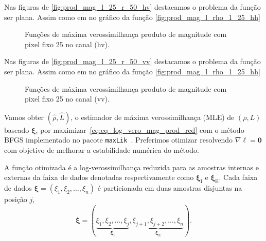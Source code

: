 Nas figuras de \eqref{fig:prod_mag_l_25_r_50_hv} destacamos o problema da função ser plana. Assim como em no gráfico da função \eqref{fig:prod_mag_l_rho_1_25_hh} 


\begin{figure*}[hbt]
	\centering
     \caption{Funções de máxima verossimilhança produto de magnitude com pixel fixo 25 no canal (hv).}
     \label{fig:prod_mag_l_25_r_50_hv} 
   \end{figure*}

Nas figuras de \eqref{fig:prod_mag_l_25_r_50_vv} destacamos o problema da função ser plana. Assim como em no gráfico da função \eqref{fig:prod_mag_l_rho_1_25_hh} 

\begin{figure*}[hbt]
	\centering
     \caption{Funções de máxima verossimilhança produto de magnitude com pixel fixo 25 no canal (vv).}
     \label{fig:prod_mag_l_25_r_50_vv} 
   \end{figure*}


Vamos obter $(\widehat \rho, \widehat L)$, o estimador de máxima verossimilhança (MLE) de $(\rho, L)$ baseado $\bm \xi$, por maximizar~\eqref{eq:eq_log_vero_mag_prod_red} com o método BFGS implementado no pacote \texttt{maxLik}~\citep{ht}. Preferimos otimizar resolvendo $\nabla\ell=\bm 0$ com objetivo de melhorar a estabilidade numérica do método.

A função otimizada é a log-verossimilhança reduzida para as amostras internas e externas da faixa de dados denotadas respectivamente como $\bm \xi_\text{I}$ e $\bm \xi_\text{E}$. Cada faixa de dados $\bm \xi = (\xi_1,\xi_2,\dots,\xi_n)$ é particionada em duas amostras disjuntas na posição $j$,  
$$
\bm \xi = (\underbrace{\xi_1,\xi_2,\dots,\xi_j}_{\bm \xi_\text{I}}, 
\underbrace{\xi_{j+1}, \xi_{j+2},\dots,\xi_n}_{\bm \xi_\text{E}}).
$$


